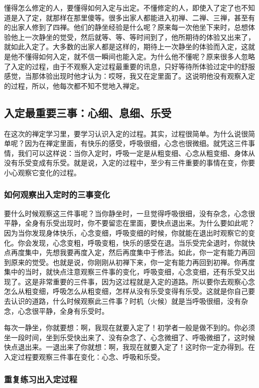 \documentclass{book}
\begin{document}
懂得怎么修定的人，要懂得如何入定与出定。不懂修定的人，即使入了定了也不知道是入了定，就那样在那里傻等。很多出家人都能进入初禅、二禅、三禅，甚至有的出家人修到了四禅。他们的静坐经验是什么呢？原来每一次他坐下来时，总想体验他上一次静坐的觉受，然后就等、等、等时间到了，他所期待的体验又出来了，就如此入定了。大多数的出家人都是这样的，期待上一次静坐的体验而入定，这就是他不懂得如何入定，就不信一瞬间也能入定。为什么他不懂呢？原来很多人忽略了入定的过程，由于不观察入定过程最重要的讯息，只好等待所体验过定中的舒服感觉，当那体验出现时他才认为：哎呀，我又在定里面了。这说明他没有观察入定的过程，所以，他每次都不知不觉地入禅定。

\subsection{入定最重要三事：心细、息细、乐受}

在这次的禅定学习里，要学习认识入定的过程。其实，过程很简单。为什么说很简单呢？因为在禅定里面，有快乐的感受，呼吸很细，心念也很微细。就凭这三件事情，我们可以这样说：当你入定时，呼吸一定是从粗变细、心念从粗变细、身体从没有乐受变成有乐受。就是说，入定的过程中，至少有三件重要的事情在变，你要小心观察它变化的过程。

\subsubsection{如何观察出入定时的三事变化}

要什么时候观察这三件事呢？当你静坐时，一旦觉得呼吸很细，没有杂念，心念很平静，全身有乐受出现时，你不要留恋在里面，要快点退出来。为什么要如此呢？因为当你发现身体快乐，心念变细，呼吸变细的时候，你就能在退出时观察它的变化。你会发现，心念变粗，呼吸变粗，快乐的感受在退。当乐受完全退时，你就快点再度集中，先想我要再度入定，然后再度集中于修法。如此，你一定有能力再回到原来的觉受。也就是说，你刚刚从初禅下来，你一定有能力再回到初禅。你再度集中的当时，就快点注意观察三件事的变化，呼吸变细，心念变细，还有乐受又出现了。这是非常重要的三件事，因为这过程就是入定的道路。所以要你去观察心念怎么从粗变细，呼吸怎么从粗变细，怎样从没有乐受变得有乐受。这就是你自己要去认识的道路，什么时候观察此三件事？时机（火候）就是当呼吸很细，没有杂念，心念很平静，全身有乐受时。

每次一静坐，你就要想：啊，我现在就要入定了！初学者一般是做不到的。你必须坐一段时间，坐到乐受快出来了、没有杂念了、心念微细了、呼吸微细了，这时候快点退出来。一退出来了你就想：啊，我现在就要入定了！这时你一定办得到。在入定过程要观察三件事在变化：心念、呼吸和乐受。

\subsubsection{重复练习出入定过程}
\end{document}
